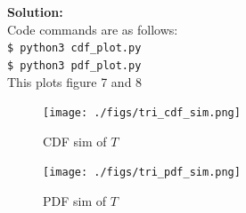 \documentclass[journal,12pt,twocolumn]{IEEEtran}
\begin{document}
\begin{enumerate}[label=\thesection.\arabic*
,ref=\thesection.\theenumi]
    \textbf{Solution: }\\
Code commands are as follows:\\
\texttt{\$ python3 cdf\_plot.py}\\
\texttt{\$ python3 pdf\_plot.py}\\
This plots figure 7 and 8\\
\begin{figure}[!ht]
\centering
\texttt{[image: ./figs/tri\_cdf\_sim.png]}
\caption{CDF sim of $T$}
\label{fig:CDF_T_sim}
\end{figure}
\begin{figure}[!ht]
\centering
\texttt{[image: ./figs/tri\_pdf\_sim.png]}
\caption{PDF sim of $T$}
\label{fig:PDF_T_sim}
\end{figure}







\end{enumerate}
\end{document}
